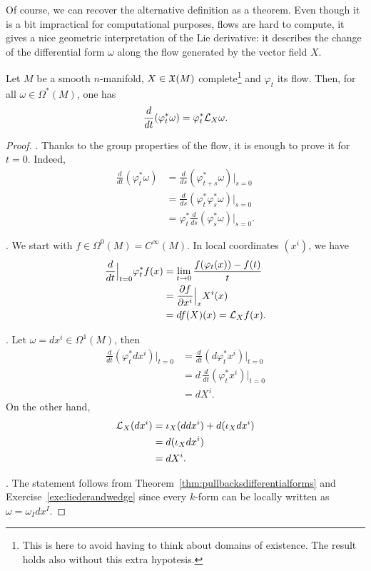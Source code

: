 Of course, we can recover the alternative definition as a theorem.
Even though it is a bit impractical for computational purposes, flows are hard to compute, it gives a nice geometric interpretation of the Lie derivative: it describes the change of the differential form $\omega$ along the flow generated by the vector field $X$.

\begin{theorem}\label{thm:LieDerivativeFlow}
  Let $M$ be a smooth $n$-manifold, $X\in\mathfrak{X}(M)$ complete\footnote{This is here to avoid having to think about domains of existence. The result holds also without this extra hypotesis.} and $\varphi_t$ its flow.
  Then, for all $\omega\in \Omega^*(M)$, one has
  \begin{equation}
    \frac{d}{dt}(\varphi_t^* \omega) = \varphi_t^*\mathcal{L}_X\omega.
  \end{equation}
\end{theorem}
\begin{proof}
  .
  Thanks to the group properties of the flow, it is enough to prove it for $t=0$.
  Indeed,
  \begin{align}
    \frac{d}{dt}(\varphi_t^* \omega)
    &= \frac{d}{ds}(\varphi_{t+s}^* \omega)\Big|_{s=0} \\
    &= \frac{d}{ds}(\varphi_t^*\varphi_s^*\omega)\Big|_{s=0} \\
    &= \varphi^*_t \frac{d}{ds}(\varphi_s^*\omega)\Big|_{s=0}.
  \end{align}

  .
  We start with $f\in\Omega^0(M) = C^\infty(M)$.
  In local coordinates $(x^i)$, we have
  \begin{align}
    \frac{d}{dt}\Big|_{t=0}\varphi_t^* f(x) 
    &= \lim_{t\to0} \frac{f(\varphi_t(x)) - f(t)}{t} \\
    &= \frac{\partial f}{\partial x^i}\Big|_x X^i(x) \\
    &= df(X)(x) = \mathcal{L}_X f(x).
  \end{align} 

  . Let $\omega = dx^i \in \Omega^1(M)$, then
  \begin{align}
    \frac{d}{dt}(\varphi_t^* dx^i)\Big|_{t=0}
    &= \frac{d}{dt}(d\varphi_t^* x^i)\Big|_{t=0} \\
    &= d\, \frac{d}{dt}(\varphi_t^* x^i)\Big|_{t=0} \\
    &= dX^i.
  \end{align}
  On the other hand,
  \begin{align}
    \mathcal{L}_X(dx^i)
    &= \iota_X(ddx^i) + d(\iota_X dx^i)\\
    &= d(\iota_X dx^i) \\
    &= dX^i.
  \end{align}

  . The statement follows from Theorem~\ref{thm:pullbacksdifferentialforms} and Exercise~\ref{exe:liederandwedge} since every $k$-form can be locally written as $\omega = \omega_I dx^I$.
\end{proof}

